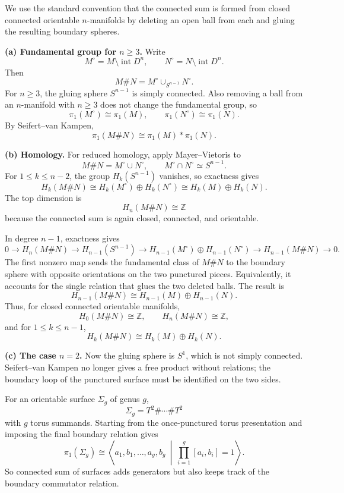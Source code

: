 \begin{solution}
We use the standard convention that the connected sum is formed from closed connected orientable $n$-manifolds by deleting an open ball from each and gluing the resulting boundary spheres.

\textbf{(a) Fundamental group for $n\geq 3$.}
Write
\[
M^\circ=M\setminus \operatorname{int}D^n,\qquad
N^\circ=N\setminus \operatorname{int}D^n.
\]
Then
\[
M\# N=M^\circ\cup_{S^{n-1}}N^\circ.
\]
For $n\geq 3$, the gluing sphere $S^{n-1}$ is simply connected. Also removing a ball from an $n$-manifold with $n\geq 3$ does not change the fundamental group, so
\[
\pi_1(M^\circ)\cong \pi_1(M),\qquad
\pi_1(N^\circ)\cong \pi_1(N).
\]
By Seifert--van Kampen,
\[
\pi_1(M\# N)\cong \pi_1(M)*\pi_1(N).
\]

\textbf{(b) Homology.}
For reduced homology, apply Mayer--Vietoris to
\[
M\# N=M^\circ\cup N^\circ,\qquad M^\circ\cap N^\circ\simeq S^{n-1}.
\]
For $1\leq k\leq n-2$, the group $H_k(S^{n-1})$ vanishes, so exactness gives
\[
H_k(M\# N)\cong H_k(M^\circ)\oplus H_k(N^\circ)
\cong H_k(M)\oplus H_k(N).
\]
The top dimension is
\[
H_n(M\# N)\cong \mathbb{Z}
\]
because the connected sum is again closed, connected, and orientable.

In degree $n-1$, exactness gives
\[
0\to H_n(M\# N)\to H_{n-1}(S^{n-1})
\to H_{n-1}(M^\circ)\oplus H_{n-1}(N^\circ)
\to H_{n-1}(M\# N)\to 0.
\]
The first nonzero map sends the fundamental class of $M\#N$ to the boundary sphere with opposite orientations on the two punctured pieces. Equivalently, it accounts for the single relation that glues the two deleted balls. The result is
\[
H_{n-1}(M\#N)\cong H_{n-1}(M)\oplus H_{n-1}(N).
\]
Thus, for closed connected orientable manifolds,
\[
H_0(M\# N)\cong \mathbb{Z},\qquad
H_n(M\# N)\cong \mathbb{Z},
\]
and for $1\leq k\leq n-1$,
\[
H_k(M\#N)\cong H_k(M)\oplus H_k(N).
\]

\textbf{(c) The case $n=2$.}
Now the gluing sphere is $S^1$, which is not simply connected. Seifert--van Kampen no longer gives a free product without relations; the boundary loop of the punctured surface must be identified on the two sides.

For an orientable surface $\Sigma_g$ of genus $g$,
\[
\Sigma_g=T^2\#\cdots\#T^2
\]
with $g$ torus summands. Starting from the once-punctured torus presentation and imposing the final boundary relation gives
\[
\pi_1(\Sigma_g)
\cong
\left\langle
a_1,b_1,\dots,a_g,b_g
\ \middle|\
\prod_{i=1}^g [a_i,b_i]=1
\right\rangle.
\]
So connected sum of surfaces adds generators but also keeps track of the boundary commutator relation.
\end{solution}

